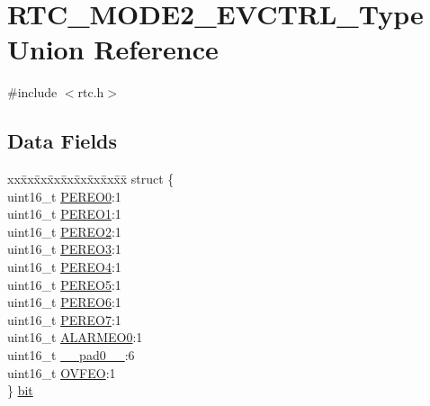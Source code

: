 \hypertarget{union_r_t_c___m_o_d_e2___e_v_c_t_r_l___type}{}\section{R\+T\+C\+\_\+\+M\+O\+D\+E2\+\_\+\+E\+V\+C\+T\+R\+L\+\_\+\+Type Union Reference}
\label{union_r_t_c___m_o_d_e2___e_v_c_t_r_l___type}


{\ttfamily \#include $<$rtc.\+h$>$}

\subsection*{Data Fields}
\begin{DoxyCompactItemize}
\item 
\begin{tabbing}
xx\=xx\=xx\=xx\=xx\=xx\=xx\=xx\=xx\=\kill
struct \{\\
\>uint16\_t \mbox{\hyperlink{union_r_t_c___m_o_d_e2___e_v_c_t_r_l___type_a038cf8cfc1288382b89f2a9eb8dc61d1}{PEREO0}}:1\\
\>uint16\_t \mbox{\hyperlink{union_r_t_c___m_o_d_e2___e_v_c_t_r_l___type_a5d14d8ffdf50889eaf20c044b17d5e93}{PEREO1}}:1\\
\>uint16\_t \mbox{\hyperlink{union_r_t_c___m_o_d_e2___e_v_c_t_r_l___type_a97880ca3fc48b61978115b9b2ccbe83f}{PEREO2}}:1\\
\>uint16\_t \mbox{\hyperlink{union_r_t_c___m_o_d_e2___e_v_c_t_r_l___type_a5c520f909edfd0b7aac696401e7dd0b6}{PEREO3}}:1\\
\>uint16\_t \mbox{\hyperlink{union_r_t_c___m_o_d_e2___e_v_c_t_r_l___type_a586ce89832afa164a4f8e2964b85e939}{PEREO4}}:1\\
\>uint16\_t \mbox{\hyperlink{union_r_t_c___m_o_d_e2___e_v_c_t_r_l___type_a5b9fe3e4351dadf30cc294f6fb3005e9}{PEREO5}}:1\\
\>uint16\_t \mbox{\hyperlink{union_r_t_c___m_o_d_e2___e_v_c_t_r_l___type_a08cf324e465c485498d57c5746df14b7}{PEREO6}}:1\\
\>uint16\_t \mbox{\hyperlink{union_r_t_c___m_o_d_e2___e_v_c_t_r_l___type_a0118b512cae84cadf15a886f3e7a39b6}{PEREO7}}:1\\
\>uint16\_t \mbox{\hyperlink{union_r_t_c___m_o_d_e2___e_v_c_t_r_l___type_a6253b240dece6e13c8459eb114fea9c1}{ALARMEO0}}:1\\
\>uint16\_t \mbox{\hyperlink{union_r_t_c___m_o_d_e2___e_v_c_t_r_l___type_a77132c2c26a75f5b8751b235cda23828}{\_\_pad0\_\_}}:6\\
\>uint16\_t \mbox{\hyperlink{union_r_t_c___m_o_d_e2___e_v_c_t_r_l___type_ad5675910f0a67704471b8e7f6ea2014e}{OVFEO}}:1\\
\} \mbox{\hyperlink{union_r_t_c___m_o_d_e2___e_v_c_t_r_l___type_acceb3f6d988e4e64156d2072334d4f1f}{bit}}\\


\end{tabbing}
\end{DoxyCompactItemize}
